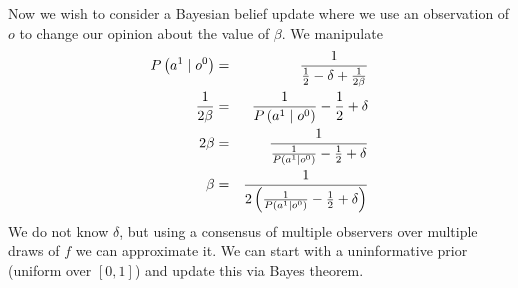\documentclass{amsart}
\theoremstyle{definition}
\theoremstyle{plain}
\numberwithin{equation}{section}
\begin{document}
Now we wish to consider a Bayesian belief update where we use an observation
of $o$ to change our opinion about the value of $\beta $. We manipulate%
\begin{eqnarray*}
P\left( a^{1}\mid o^{0}\right)  &=&\frac{1}{\frac{1}{2}-\delta +\frac{1}{%
2\beta }} \\
\frac{1}{2\beta } &=&\frac{1}{P\left( a^{1}\mid o^{0}\right) }-\frac{1}{2}%
+\delta  \\
2\beta  &=&\frac{1}{\frac{1}{P\left( a^{1}\mid o^{0}\right) }-\frac{1}{2}%
+\delta } \\
\beta  &=&\frac{1}{2\left( \frac{1}{P\left( a^{1}\mid o^{0}\right) }-\frac{1%
}{2}+\delta \right) }
\end{eqnarray*}%
We do not know $\delta $, but using a consensus of multiple observers over
multiple draws of $f$ we can approximate it. We can start with a
uninformative prior (uniform over $\left[ 0,1\right] $) and update this via
Bayes theorem.



\end{document}
